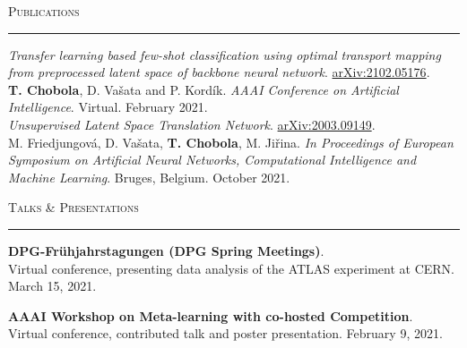 \documentclass[10pt]{article}
\begin{document}

\begin{Large}
    \textsc{Publications}
    \vspace{0.4em}
    \hrule
    \vspace{0.4em}
\end{Large}
\begin{normalsize}
    \textit{Transfer learning based few-shot classification using optimal transport mapping from preprocessed latent space of backbone neural network}. \href{https://arxiv.org/abs/2102.05176}{arXiv:2102.05176}.\\
    \textbf{T. Chobola}, D. Vašata and P. Kordík. \textit{ AAAI Conference on Artificial Intelligence}. Virtual. February 2021.\\
    
   \textit{Unsupervised Latent Space Translation Network}. \href{https://arxiv.org/abs/2003.09149}{arXiv:2003.09149}.\\
   M. Friedjungová, D. Vašata, \textbf{T. Chobola}, M. Jiřina. \textit{In Proceedings of  European Symposium on Artificial Neural Networks, Computational Intelligence and Machine Learning}. Bruges, Belgium. October 2021.\\
\end{normalsize}

\begin{Large}
    \textsc{Talks \& Presentations}
    \vspace{0.4em}
    \hrule
    \vspace{0.4em}
\end{Large}

\begin{normalsize}
    \textbf{DPG-Frühjahrstagungen (DPG Spring Meetings)}.\\
    Virtual conference, presenting data analysis of the ATLAS experiment at CERN. March 15, 2021.\\
\end{normalsize}

\begin{normalsize}
    \textbf{AAAI Workshop on Meta-learning with co-hosted Competition}.\\
    Virtual conference, contributed talk and poster presentation. February 9, 2021.\\
\end{normalsize}
\newpage
\end{document}
